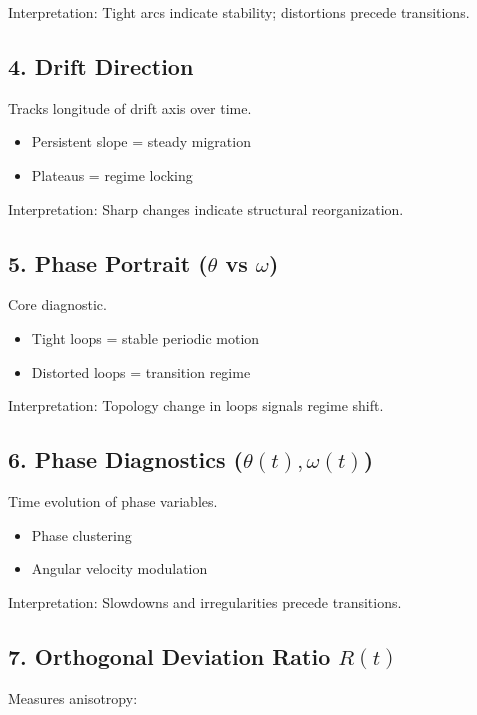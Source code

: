 \documentclass[11pt]{article}
\begin{document}
Interpretation:
Tight arcs indicate stability; distortions precede transitions.

\subsection{4. Drift Direction}

Tracks longitude of drift axis over time.

\begin{itemize}
\item Persistent slope = steady migration
\item Plateaus = regime locking
\end{itemize}

Interpretation:
Sharp changes indicate structural reorganization.

\subsection{5. Phase Portrait ($\theta$ vs $\omega$)}

Core diagnostic.

\begin{itemize}
\item Tight loops = stable periodic motion
\item Distorted loops = transition regime
\end{itemize}

Interpretation:
Topology change in loops signals regime shift.

\subsection{6. Phase Diagnostics ($\theta(t), \omega(t)$)}

Time evolution of phase variables.

\begin{itemize}
\item Phase clustering
\item Angular velocity modulation
\end{itemize}

Interpretation:
Slowdowns and irregularities precede transitions.

\subsection{7. Orthogonal Deviation Ratio $R(t)$}

Measures anisotropy:
\end{document}
